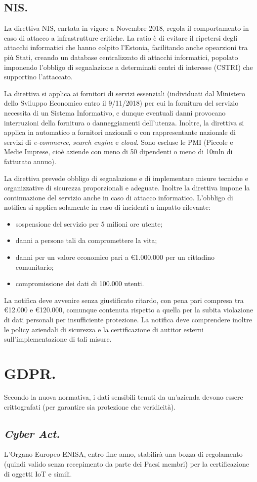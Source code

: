 \documentclass[a4page, 11pt, twocolumn]{article}
\begin{document}
\subsection{NIS.}
La direttiva NIS, enrtata in vigore a Novembre 2018, regola il comportamento in caso di attacco a infrastrutture critiche.
La ratio è di evitare il ripetersi degli attacchi informatici che hanno colpito l'Estonia, facilitando anche opearzioni tra più Stati, creando un database centralizzato di attacchi informatici, popolato imponendo l'obbligo di segnalazione a determinati centri di interesse (CSTRI) che supportino l'attaccato.

La direttiva si applica ai fornitori di servizi essenziali (individuati dal Ministero dello Sviluppo Economico entro il 9/11/2018) per cui la fornitura del servizio necessita di un Sistema Informativo, e dunque eventuali danni provocano interruzioni della fornitura o danneggiamenti dell'utenza.
Inoltre, la direttiva si applica in automatico a fornitori nazionali o con rappresentante nazionale di servizi di \textit{e-commerce}, \textit{search engine} e \textit{cloud}.
Sono escluse le PMI (Piccole e Medie Imprese, cioè aziende con meno di 50 dipendenti o meno di 10mln di fatturato annuo).

La direttiva prevede obbligo di segnalazione e di implementare misure tecniche e organizzative di sicurezza proporzionali e adeguate.
Inoltre la direttiva impone la continuazione del servizio anche in caso di attacco informatico.
L'obbligo di notifica si applica solamente in caso di incidenti a impatto rilevante:
\begin{itemize}
\item sospensione del servizio per 5 milioni ore utente;
\item danni a persone tali da compromettere la vita;
\item danni per un valore economico pari a \euro{1.000.000} per un cittadino comunitario;
\item compromissione dei dati di 100.000 utenti.
\end{itemize}

La notifica deve avvenire senza giustificato ritardo, con pena pari compresa tra \euro{12.000} e \euro{120.000}, comunque contenuta rispetto a quella per la subita violazione di dati personali per insufficiente protezione.
La notifica deve comprendere inoltre le policy aziendali di sicurezza e la certificazione di autitor esterni sull'implementazione di tali misure.

\section{GDPR.}
Secondo la nuova normativa, i dati sensibili tenuti da un'azienda devono essere crittografati (per garantire sia protezione che veridicità).

\subsection{\textit{Cyber Act.}}
L'Organo Europeo ENISA, entro fine anno, stabilirà una bozza di regolamento (quindi valido senza recepimento da parte dei Paesi membri) per la certificazione di oggetti IoT e simili.
\end{document}
